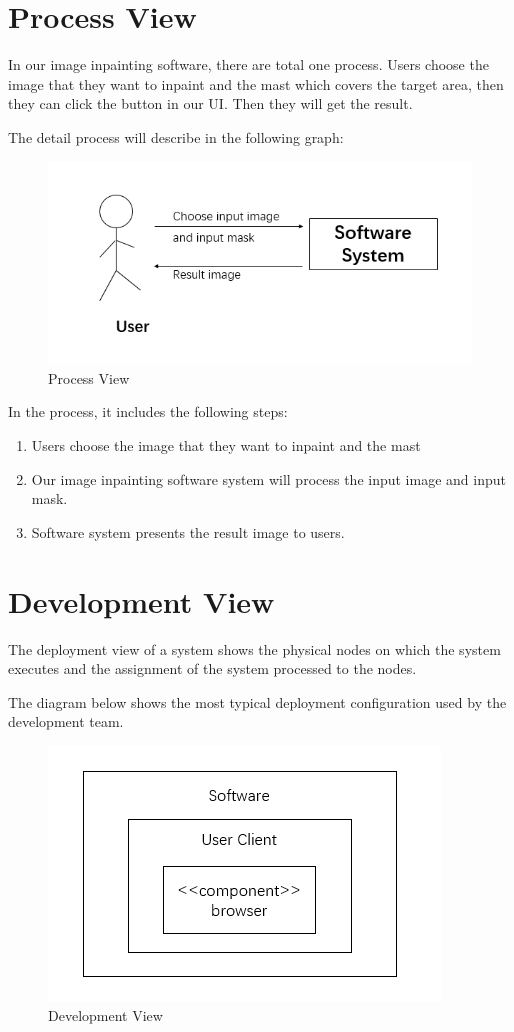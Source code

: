 \section{Process View}
\qquad In our image inpainting software, there are total one process. Users choose the image that they want to inpaint and the mast which covers the target area, then they can click the button in our UI. Then they will get the result. 

The detail process will describe in the following graph:
\begin{figure}[H]
	\centering
	\includegraphics[width=1.0\linewidth]{process.jpg}
	\caption{Process View}
\end{figure}

In the process, it includes the following steps:
\begin{enumerate}
	\item Users choose the image that they want to inpaint and the mast
	\item Our image inpainting software system will process the input image and input mask.
	\item Software system presents the result image to users. 
\end{enumerate}

\section{Development View}
\qquad The deployment view of a system shows the physical nodes on which the system executes and the assignment of the system processed to the nodes. 

The diagram below shows the most typical deployment configuration used by the development team.
\begin{figure}[H]
	\centering
	\includegraphics[width=0.8\linewidth]{develop.jpg}
	\caption{Development View}
\end{figure}


